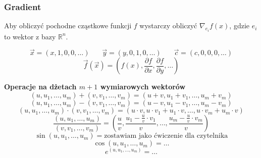 \documentclass[../mn-notatki.tex]{subfiles}
\begin{document}
\subsubsection{Gradient}
Aby obliczyć pochodne cząstkowe funkcji $f$ wystarczy obliczyć
$\nabla_{e_i}f(x)$,
gdzie $e_i$ to wektor z bazy $\mathbb{R}^n$.

\begin{tcolorbox}
\[
\vec{x} = (x, 1, 0, 0, \ldots) ~~~~~~~~ \vec{y} = (y, 0, 1, 0, \ldots) ~~~~~~~~ \vec{c} = (c, 0, 0, 0, \ldots)
\]
\[
\vec{f}(\vec{x}) = \left(f(x), \frac{\partial f}{\partial x}, \frac{\partial f}{\partial y}, \ldots \right)
\]
\end{tcolorbox}

\begin{tcolorbox}
\textbf{Operacje na dżetach $m+1$ wymiarowych wektorów}
    $$(u,u_1,\ldots, u_m) + (v,v_1,\ldots, v_m) = (u + v, u_1 + v_1, \ldots, u_m + v_m)$$
    $$(u,u_1,\ldots, u_m) - (v,v_1,\ldots, v_m) = (u - v, u_1 - v_1, \ldots, u_m - v_m)$$
    $$(u,u_1,\ldots, u_m) \cdot (v,v_1,\ldots, v_m) = (u \cdot v, u \cdot v_1 + u_1 \cdot v, \ldots, u \cdot v_m + u_m \cdot v)$$
    $$\frac{(u,u_1,\ldots, u_m)}{(v,v_1,\ldots, v_m)} = \left(\frac{u}{v}, \frac{u_1 - \frac{u}{v}\cdot v_1}{v}, \ldots, \frac{u_m - \frac{u}{v}\cdot v_m}{v}\right)$$
    $$\sin(u,u_1,\ldots, u_m) = \text{zostawiam jako ćwiczenie dla czytelnika}$$
    $$\cos(u,u_1,\ldots, u_m) = \ldots$$
    $$e^{(u,u_1,\ldots, u_m)} = \ldots$$
\end{tcolorbox}
\end{document}
